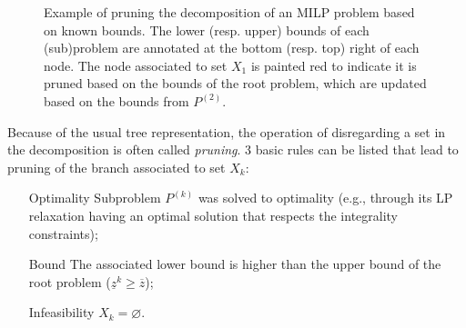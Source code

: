 \begin{figure}[h]
    \centering
    \caption{Example of pruning the decomposition of an MILP problem based on known bounds. The lower (resp. upper) bounds of each (sub)problem are annotated at the bottom (resp. top) right of each node. The node associated to set $X_1$ is painted red to indicate it is pruned based on the bounds of the root problem, which are updated based on the bounds from $P^{(2)}$.}
    \label{fig:pruning-example-milp}
\end{figure}

Because of the usual tree representation, the operation of disregarding a set in the decomposition is often called \emph{pruning}.
3 basic rules can be listed that lead to pruning of the branch associated to set $X_k$:
\begin{itemize}
    \item[Optimality] Subproblem $P^{(k)}$ was solved to optimality (e.g., through its LP relaxation having an optimal solution that respects the integrality constraints);
    \item[Bound] The associated lower bound is higher than the upper bound of the root problem ($\underline{z}^{k}\ge \overline{z}$);
    \item[Infeasibility] $X_k = \varnothing$.
\end{itemize}


